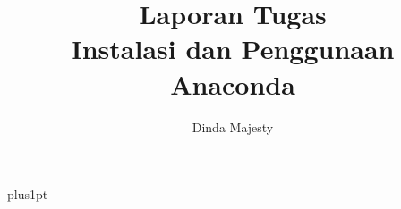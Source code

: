\documentclass[12pt]{ociamthesis}  %
\title{Laporan Tugas\\[1ex]     %
        Instalasi dan Penggunaan Anaconda}   %
\author{Dinda Majesty}             %
\begin{document}
\baselineskip=18pt plus1pt

\setcounter{secnumdepth}{3}
\setcounter{tocdepth}{3}


\maketitle                  %

\begin{romanpages}          %
\tableofcontents            %
\listoffigures              %
\lstlistoflistings
\end{romanpages}            %

%
%
%

\end{document}

